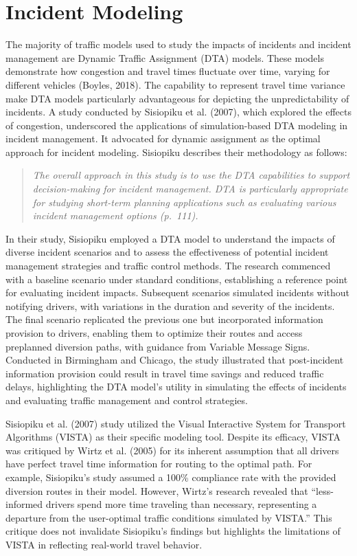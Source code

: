 \documentclass[fancy, oneside, mastersfancy, ms]{byuthesis}
\begin{document}
\hypertarget{sec-inc_modeling}{%
\section{Incident Modeling}\label{sec-inc_modeling}}

The majority of traffic models used to study the impacts of incidents
and incident management are Dynamic Traffic Assignment (DTA) models.
These models demonstrate how congestion and travel times fluctuate over
time, varying for different vehicles (Boyles, 2018). The capability to
represent travel time variance make DTA models particularly advantageous
for depicting the unpredictability of incidents. A study conducted by
Sisiopiku et al. (2007), which explored the effects of congestion,
underscored the applications of simulation-based DTA modeling in
incident management. It advocated for dynamic assignment as the optimal
approach for incident modeling. Sisiopiku describes their methodology as
follows:

\begin{quote}
\emph{The overall approach in this study is to use the DTA capabilities
to support decision-making for incident management. DTA is particularly
appropriate for studying short-term planning applications such as
evaluating various incident management options (p.~111).}
\end{quote}

In their study, Sisiopiku employed a DTA model to understand the impacts
of diverse incident scenarios and to assess the effectiveness of
potential incident management strategies and traffic control methods.
The research commenced with a baseline scenario under standard
conditions, establishing a reference point for evaluating incident
impacts. Subsequent scenarios simulated incidents without notifying
drivers, with variations in the duration and severity of the incidents.
The final scenario replicated the previous one but incorporated
information provision to drivers, enabling them to optimize their routes
and access preplanned diversion paths, with guidance from Variable
Message Signs. Conducted in Birmingham and Chicago, the study
illustrated that post-incident information provision could result in
travel time savings and reduced traffic delays, highlighting the DTA
model's utility in simulating the effects of incidents and evaluating
traffic management and control strategies.

Sisiopiku et al. (2007) study utilized the Visual Interactive System for
Transport Algorithms (VISTA) as their specific modeling tool. Despite
its efficacy, VISTA was critiqued by Wirtz et al. (2005) for its
inherent assumption that all drivers have perfect travel time
information for routing to the optimal path. For example, Sisiopiku's
study assumed a 100\% compliance rate with the provided diversion routes
in their model. However, Wirtz's research revealed that ``less-informed
drivers spend more time traveling than necessary, representing a
departure from the user-optimal traffic conditions simulated by VISTA.''
This critique does not invalidate Sisiopiku's findings but highlights
the limitations of VISTA in reflecting real-world travel behavior.
\end{document}
